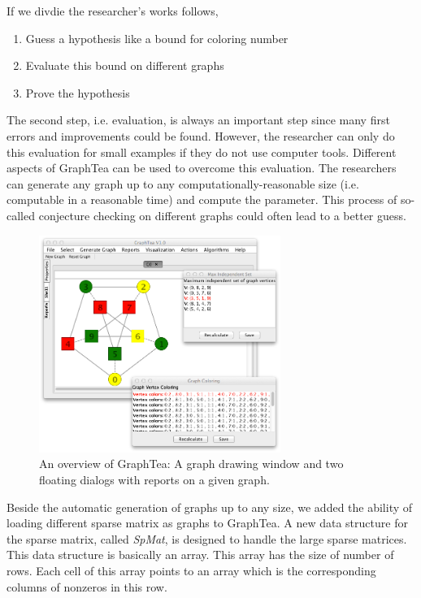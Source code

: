 \documentclass[12pt, oneside]{book}
\begin{document}
If we divdie the researcher's works follows,
\begin{enumerate}
\item Guess a hypothesis like a bound for coloring number
\item Evaluate this bound on different graphs
\item Prove the hypothesis
\end{enumerate}
The second step, i.e. evaluation, is always an important step since many first errors and 
improvements could be found.
However, the researcher can only do this evaluation for small examples if they do not
use computer tools. 
Different aspects of GraphTea can be used to overcome this evaluation.
The researchers can generate any graph up to any computationally-reasonable size
(i.e. computable in a reasonable time) and compute the parameter.
This process of so-called conjecture checking on different graphs could often lead to a better guess.
\begin{figure}
\centering
\includegraphics[width=0.7\textwidth]{graphtea}
\caption{An overview of GraphTea: A graph drawing window and 
two floating dialogs with reports on a given graph.}
\label{f.graphtea}
\end{figure}

Beside the automatic generation of graphs up to any size, we added the ability of loading
different sparse matrix as graphs to GraphTea.
A new data structure for the sparse matrix, called \textit{SpMat}, is designed
to handle the large sparse matrices. This data structure is basically an array.
This array has the size of number of rows. Each cell of this array points to 
an array which is the corresponding columns of nonzeros in this row. 
\end{document}
